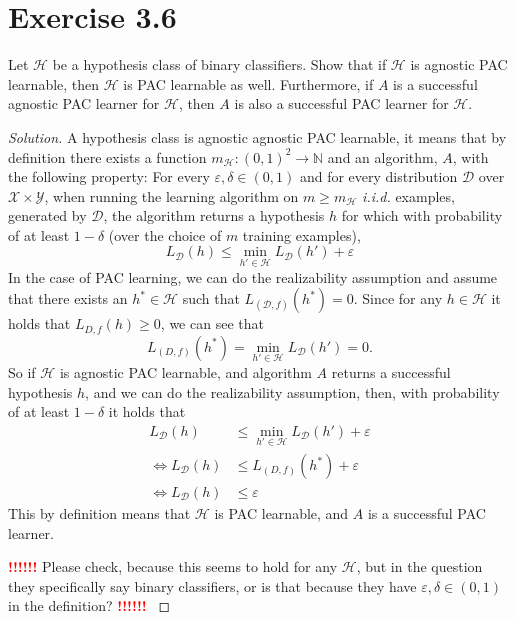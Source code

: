 \documentclass[10pt, a4paper, twoside]{amsart}
\newcommand{\N}{\ensuremath{\mathbb{N}}}
\newenvironment{solution}
               {\let\oldqedsymbol=\qedsymbol
                \renewcommand{\qedsymbol}{$\blacktriangleleft$}
                \begin{proof}[Solution]}
               {\end{proof}
                \renewcommand{\qedsymbol}{\oldqedsymbol}}
\newcommand{\TODO}{\textcolor{red}{\textbf{!!!!!! }}}
\begin{document}
\section*{Exercise 3.6}
Let $\mathcal{H}$ be a hypothesis class of binary classifiers. Show that if $\mathcal{H}$ is agnostic PAC learnable, then $\mathcal{H}$ is PAC learnable as well.
Furthermore, if $A$ is a successful agnostic PAC learner for $\mathcal{H}$, then $A$ is also a successful PAC learner for $\mathcal{H}$.
\begin{solution}
  A hypothesis class is agnostic agnostic  PAC learnable, it means that by definition there exists a function $m_{\mathcal{H}}:(0,1)^2\to \N$ and an algorithm, $A$, with the following property: For every $\varepsilon, \delta \in (0,1)$ and for every distribution $\mathcal{D}$ over $\mathcal{X} \times \mathcal{Y}$, when running the learning algorithm on $m\geq m_{\mathcal{H}}$ \textit{i.i.d.} examples, generated by $\mathcal{D}$, the algorithm returns a hypothesis $h$ for which with probability of at least $1-\delta$ (over the choice of $m$ training examples),
  \begin{equation*}
    L_{\mathcal{D}}(h) \leq \min_{h' \in \mathcal{H}}L_{\mathcal{D}}(h')+\varepsilon
  \end{equation*}
  In the case of PAC learning, we can do the realizability assumption and assume that there exists an $h^* \in \mathcal{H}$ such that $L_{(\mathcal{D},f)}(h^*) = 0$. Since for any $h \in \mathcal{H}$ it holds that $L_{D,f}(h) \geq 0$, we can see that
  \begin{equation*}
    L_{(D,f)}(h^*) = \min_{h' \in \mathcal{H}}L_{\mathcal{D}}(h') =0.
  \end{equation*}
  So if $\mathcal{H}$ is agnostic PAC learnable, and algorithm $A$ returns a successful hypothesis $h$, and we can do the realizability assumption, then, with probability of at least $1-\delta$ it holds that
  \begin{align*}
    L_{\mathcal{D}}(h) &\leq \min_{h' \in \mathcal{H}}L_{\mathcal{D}}(h')+\varepsilon \\
    \iff L_{\mathcal{D}}(h) &\leq  L_{(D,f)}(h^*) + \varepsilon \\
    \iff L_{\mathcal{D}}(h) &\leq  \varepsilon
  \end{align*}
  This by definition means that $\mathcal{H}$ is PAC learnable, and $A$ is a successful PAC learner.
    
  \TODO Please check, because this seems to hold for any $\mathcal{H}$, but in the question they specifically say binary classifiers, or is that because they have $\varepsilon, \delta \in (0,1)$ in the definition? \TODO
\end{solution}
\end{document}
